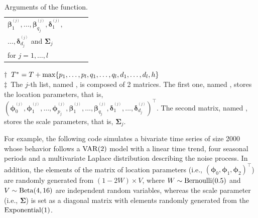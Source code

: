\begin{table}[!ht]
{\begin{center}
\begin{tabular}{llll}
$\bm{\beta}_1^{^{(j)}}\!,\ldots,\bm{\beta}_{q_j}^{^{(j)}},\bm{\delta}_1^{^{(j)}}\!,$ &    &    & \\
$\ldots,\bm{\delta}_{d_j}^{^{(j)}}$ and $\bm{\Sigma}_j$  &    &    & \\
 for $j=1,\ldots,l$  &    &    & \\
\hline
\end{tabular}
\end{center}
\vspace{-3mm}
{\footnotesize $\dagger$\, $T^*=T+{\rm max}\{p_1,\ldots,p_{l},q_1,\ldots,q_{l},d_1,\ldots,d_{l},h\}$\\
$\ddagger$\, The $j$-th list, named , is composed of 2 matrices. The first one, named , stores the location parameters, that is,
$(\bm{\phi}_0^{^{(j)}},\bm{\phi}_1^{^{(j)}},\ldots,\bm{\phi}_{p_j}^{^{(j)}},\bm{\beta}_1^{^{(j)}},\ldots,\bm{\beta}_{q_j}^{^{(j)}},
\bm{\delta}_1^{^{(j)}},\ldots,\bm{\delta}_{d_j}^{^{(j)}})^{\!\top}$. The second matrix, named , stores the scale parameters, that is,
$\bm{\Sigma}_j$.}
\caption{Arguments of the  function.}
\label{simtar}}
\end{table}

For example, the following code simulates a bivariate time series of size 2000 whose behavior follows a ${\rm VAR}(2)$ model with a linear time trend, four seasonal periods and a multivariate Laplace distribution describing the noise process. In addition, the elements of the matrix of location parameters (i.e., $(\bm{\phi}_0,\bm{\phi}_1,\bm{\phi}_2)^{\!\top}$) are randomly generated from $(1-2W)\times V$, where $W\sim {\rm Bernoulli}(0.5)$ and $V\sim{\rm Beta}(4,16)$ are independent random variables, whereas the scale parameter (i.e., $\bm{\Sigma}$) is set as a diagonal matrix with elements randomly generated from the ${\rm Exponential}(1)$.

